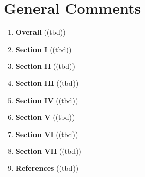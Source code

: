 
\section{General Comments}\label{sec:general}
\begin{enumerate}[resume]
    \item \textbf{Overall} 	\textcolor{HighlightColor}{((tbd))}
    \item \textbf{Section I} 	\textcolor{HighlightColor}{((tbd))}
    \item \textbf{Section II} 	\textcolor{HighlightColor}{((tbd))}
    \item \textbf{Section III} 	\textcolor{HighlightColor}{((tbd))}
    \item \textbf{Section IV} 	\textcolor{HighlightColor}{((tbd))}
    \item \textbf{Section V} 	\textcolor{HighlightColor}{((tbd))}
    \item \textbf{Section VI} 	\textcolor{HighlightColor}{((tbd))}
    \item \textbf{Section VII} 	\textcolor{HighlightColor}{((tbd))}
    \item \textbf{References} 	\textcolor{HighlightColor}{((tbd))}
\end{enumerate}
